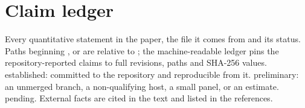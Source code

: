 \section{Claim ledger}
\label{app:claims}

Every quantitative statement in the paper, the file it comes from and its status. Paths beginning
,  or  are relative to ;
the machine-readable ledger  pins the repository-reported claims to full
revisions, paths and SHA-256 values. \est{} established:
committed to the repository and reproducible from it. \pre{} preliminary: an unmerged branch, a
non-qualifying host, a small panel, or an estimate. \pend{} pending. External facts are cited in the
text and listed in the references.


